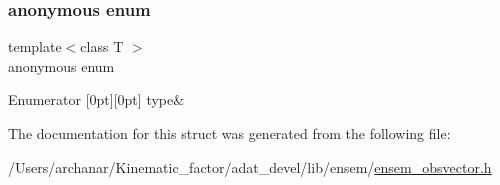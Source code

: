 \subsubsection{\texorpdfstring{anonymous enum}{anonymous enum}}
{\footnotesize\ttfamily template$<$class T $>$ \\
anonymous enum}

\begin{DoxyEnumFields}{Enumerator}
[0pt][0pt]{}\mbox{\label{structENSEM_1_1EnsbcIO_3_01OVector_3_01T_01_4_01_4_af687d4373c13ed8655d840312331adc3a5ec4910ef487633a25ec3ae40769fa45}} 
type&\\
\hline

\end{DoxyEnumFields}


The documentation for this struct was generated from the following file\+:\begin{DoxyCompactItemize}
\item 
/\+Users/archanar/\+Kinematic\+\_\+factor/adat\+\_\+devel/lib/ensem/\mbox{\hyperlink{lib_2ensem_2ensem__obsvector_8h}{ensem\+\_\+obsvector.\+h}}\end{DoxyCompactItemize}
